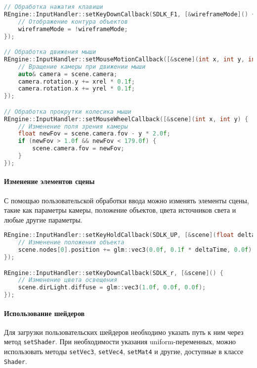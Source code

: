 \begin{lstlisting}[language=C++, caption=Пример настройки обработки ввода]
// Обработка нажатия клавиши
REngine::InputHandler::setKeyDownCallback(SDLK_F1, [&wireframeMode]() {
    // Отображение контура объектов
    wireframeMode = !wireframeMode;
});

// Обработка движения мыши
REngine::InputHandler::setMouseMotionCallback([&scene](int x, int y, int xrel, int yrel) {
    // Вращение камеры при движении мыши
    auto& camera = scene.camera;
    camera.rotation.y += xrel * 0.1f;
    camera.rotation.x += yrel * 0.1f;
});

// Обработка прокрутки колесика мыши
REngine::InputHandler::setMouseWheelCallback([&scene](int x, int y) {
    // Изменение поля зрения камеры
    float newFov = scene.camera.fov - y * 2.0f;
    if (newFov > 1.0f && newFov < 179.0f) {
        scene.camera.fov = newFov;
    }
});
\end{lstlisting}

\paragraph{Изменение элементов сцены}

С помощью пользовательской обработки ввода можно изменять элементы сцены, такие как параметры камеры, положение объектов, цвета источников света и любые другие параметры.

\begin{lstlisting}[language=C++, caption=Пример изменения параметров сцены]
REngine::InputHandler::setKeyHoldCallback(SDLK_UP, [&scene](float deltaTime) {
    // Изменение положения объекта
    scene.nodes[0].position += glm::vec3(0.0f, 0.1f * deltaTime, 0.0f);
});

REngine::InputHandler::setKeyDownCallback(SDLK_r, [&scene]() {
    // Изменение цвета освещения
    scene.dirLight.diffuse = glm::vec3(1.0f, 0.0f, 0.0f);
});
\end{lstlisting}

\paragraph{Использование шейдеров}

Для загрузки пользовательских шейдеров необходимо указать путь к ним через метод \texttt{setShader}. При необходимости указания uniform-переменных, можно использовать методы \texttt{setVec3}, \texttt{setVec4}, \texttt{setMat4} и другие, доступные в классе \texttt{Shader}.

